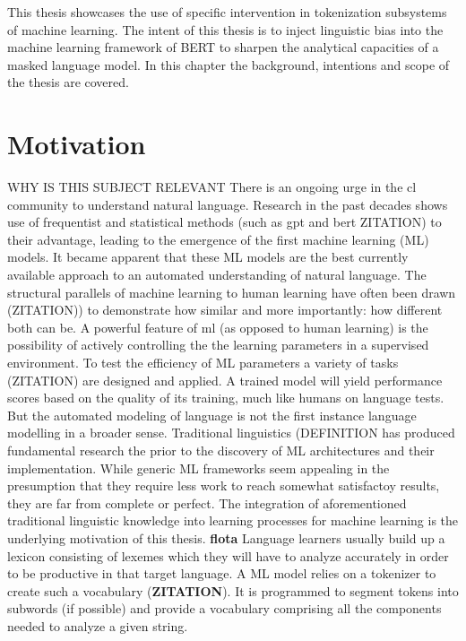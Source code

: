 
This thesis showcases the use of specific intervention in tokenization subsystems of machine learning.
The intent of this thesis is to inject linguistic bias into the machine learning framework of BERT to sharpen the analytical capacities of a masked language model.
In this chapter the background, intentions and scope of the thesis are covered.


\section{Motivation}
\label{sec:motivation}
\uppercase{Why is this subject relevant}
There is an ongoing urge in the \acf{cl} community to understand natural language.
Research in the past decades shows use of frequentist and statistical methods (such as gpt and bert \uppercase{ZITATION}) to their advantage, leading to the emergence of the first machine learning (ML) models.
It became apparent that these ML models are the best currently available approach to an automated understanding of natural language.
The structural parallels of machine learning to human learning have often been drawn (\uppercase{zitation)}) to demonstrate how similar and more importantly: how different both can be.
A powerful feature of \ac{ml} (as opposed to human learning) is the possibility of actively controlling the the learning parameters in a supervised environment.
To test the efficiency of \uppercase{ML} parameters a variety of tasks (\uppercase{zitation}) are designed and applied.
A trained model will yield performance scores based on the quality of its training, much like humans on language tests.
But the automated modeling of language is not the first instance language modelling in a broader sense.
Traditional linguistics (\uppercase{definition} has produced fundamental research the prior to the discovery of \uppercase{ML} architectures and their implementation.
While generic ML frameworks seem appealing in the presumption that they require less work to reach somewhat satisfactoy results,
they are far from complete or perfect.
The integration of aforementioned traditional linguistic knowledge into learning processes for machine learning is the underlying motivation of this thesis.
\textbf{flota} \cite{FLOTA}
Language learners usually build up a lexicon consisting of lexemes which they will have to analyze accurately in order to be productive in that target language.
A ML model relies on a tokenizer to create such a vocabulary  (\textbf{ZITATION}).
It is programmed to segment tokens into subwords (if possible) and provide a vocabulary comprising all the components needed to analyze a given string.
